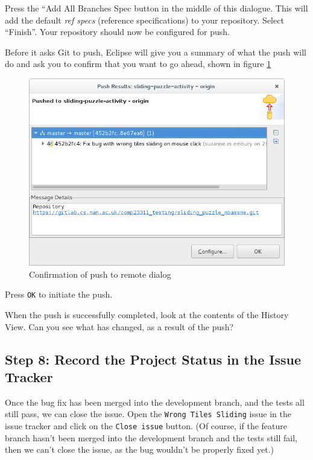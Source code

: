 \documentclass[
]{book}
\begin{document}
Press the ``Add All Branches Spec button in the middle of this dialogue. This will add the default \emph{ref specs} (reference specifications) to your repository. Select ``Finish''. Your repository should now be configured for push.

Before it asks Git to push, Eclipse will give you a summary of what the push will do and ask you to confirm that you want to go ahead, shown in figure \ref{fig:confirmationOfPushToRemote-fig}

\begin{figure}

{\centering \includegraphics[width=1\linewidth]{images/confirmationOfPushToRemote} 

}

\caption{Confirmation of push to remote dialog}\label{fig:confirmationOfPushToRemote-fig}
\end{figure}

Press \texttt{OK} to initiate the push.

When the push is successfully completed, look at the contents of the History View. Can you see what has changed, as a result of the push?

\hypertarget{issuetracker}{%
\subsection{Step 8: Record the Project Status in the Issue Tracker}\label{issuetracker}}

Once the bug fix has been merged into the development branch, and the tests all still pass, we can close the issue. Open the \texttt{Wrong\ Tiles\ Sliding} issue in the issue tracker and click on the \texttt{Close\ issue} button. (Of course, if the feature branch hasn't been merged into the development branch and the tests still fail, then we can't close the issue, as the bug wouldn't be properly fixed yet.)
\end{document}
